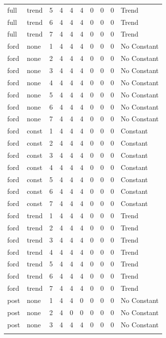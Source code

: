 \begin{longtable}[t]{llrrrrrrrl}
full & trend & 5 & 4 & 4 & 4 & 0 & 0 & 0 & Trend\\
full & trend & 6 & 4 & 4 & 4 & 0 & 0 & 0 & Trend\\
\addlinespace
full & trend & 7 & 4 & 4 & 4 & 0 & 0 & 0 & Trend\\
ford & none & 1 & 4 & 4 & 4 & 0 & 0 & 0 & No Constant\\
ford & none & 2 & 4 & 4 & 4 & 0 & 0 & 0 & No Constant\\
ford & none & 3 & 4 & 4 & 4 & 0 & 0 & 0 & No Constant\\
ford & none & 4 & 4 & 4 & 4 & 0 & 0 & 0 & No Constant\\
\addlinespace
ford & none & 5 & 4 & 4 & 4 & 0 & 0 & 0 & No Constant\\
ford & none & 6 & 4 & 4 & 4 & 0 & 0 & 0 & No Constant\\
ford & none & 7 & 4 & 4 & 4 & 0 & 0 & 0 & No Constant\\
ford & const & 1 & 4 & 4 & 4 & 0 & 0 & 0 & Constant\\
ford & const & 2 & 4 & 4 & 4 & 0 & 0 & 0 & Constant\\
\addlinespace
ford & const & 3 & 4 & 4 & 4 & 0 & 0 & 0 & Constant\\
ford & const & 4 & 4 & 4 & 4 & 0 & 0 & 0 & Constant\\
ford & const & 5 & 4 & 4 & 4 & 0 & 0 & 0 & Constant\\
ford & const & 6 & 4 & 4 & 4 & 0 & 0 & 0 & Constant\\
ford & const & 7 & 4 & 4 & 4 & 0 & 0 & 0 & Constant\\
\addlinespace
ford & trend & 1 & 4 & 4 & 4 & 0 & 0 & 0 & Trend\\
ford & trend & 2 & 4 & 4 & 4 & 0 & 0 & 0 & Trend\\
ford & trend & 3 & 4 & 4 & 4 & 0 & 0 & 0 & Trend\\
ford & trend & 4 & 4 & 4 & 4 & 0 & 0 & 0 & Trend\\
ford & trend & 5 & 4 & 4 & 4 & 0 & 0 & 0 & Trend\\
\addlinespace
ford & trend & 6 & 4 & 4 & 4 & 0 & 0 & 0 & Trend\\
ford & trend & 7 & 4 & 4 & 4 & 0 & 0 & 0 & Trend\\
post & none & 1 & 4 & 4 & 0 & 0 & 0 & 0 & No Constant\\
post & none & 2 & 4 & 0 & 0 & 0 & 0 & 0 & No Constant\\
post & none & 3 & 4 & 4 & 4 & 0 & 0 & 0 & No Constant\\
\addlinespace

\end{longtable}
